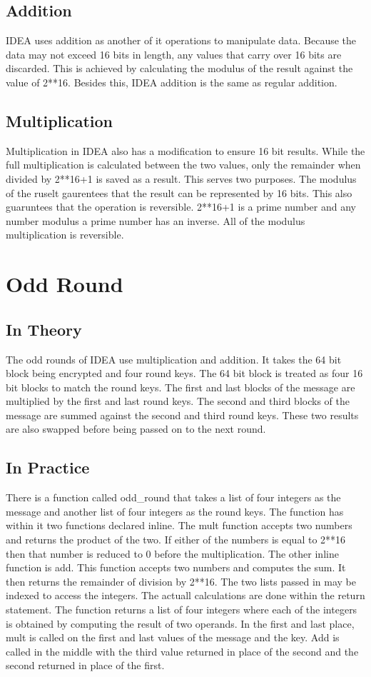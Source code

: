 \documentclass[12pt]{article}
\begin{document}
\subsection{Addition}
IDEA uses addition as another of it operations to manipulate data. Because the data may not exceed 16 bits in length, any values that carry over 16 bits are discarded. This is achieved by calculating the modulus of the result against the value of 2**16. Besides this, IDEA addition is the same as regular addition.
\subsection{Multiplication}
Multiplication in IDEA also has a modification to ensure 16 bit results. While the full multiplication is calculated between the two values, only the remainder when divided by 2**16+1 is saved as a result. This serves two purposes. The modulus of the ruselt gaurentees that the result can be represented by 16 bits. This also guaruntees that the operation is reversible.
2**16+1 is a prime number and any number modulus a prime number has an inverse. All of the modulus multiplication is reversible.
\section{Odd Round}
\subsection{In Theory}
The odd rounds of IDEA use multiplication and addition. It takes the 64 bit block being encrypted and four round keys. The 64 bit block is treated as four 16 bit blocks to match the round keys. The first and last blocks of the message are multiplied by the first and last round keys. The second and third blocks of the message are summed against the second and third round keys. These two results are also swapped before being passed on to the next round.
\subsection{In Practice}
There is a function called odd\_round that takes a list of four integers as the message and another list of four integers as the round keys. The function has within it two functions declared inline. The mult function accepts two numbers and returns the product of the two. If either of the numbers is equal to 2**16 then that number is reduced to 0 before the multiplication. The other inline function is add. This function accepts two numbers and computes the sum. It then returns the remainder of division by 2**16.
The two lists passed in may be indexed to access the integers. The actuall calculations are done within the return statement. The function returns a list of four integers where each of the integers is obtained by computing the result of two operands. In the first and last place, mult is called on the first and last values of the message and the key. Add is called in the middle with the third value returned in place of the second and the second returned in place of the first.
\end{document}
